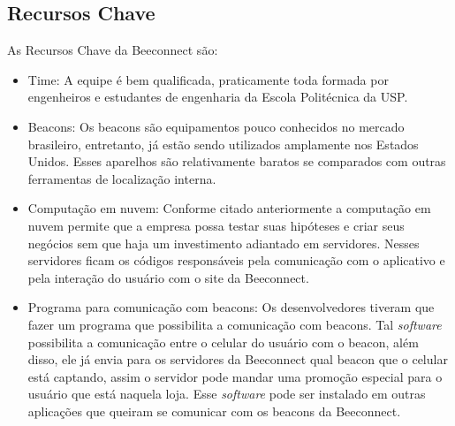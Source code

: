 \subsection{Recursos Chave}
\label{cha:recursos_chave}
As Recursos Chave da Beeconnect são:
\begin{itemize}
\item Time: A equipe é bem qualificada, praticamente toda formada por engenheiros e estudantes de engenharia da Escola Politécnica da USP.
\item Beacons: Os beacons são equipamentos pouco conhecidos no mercado brasileiro, entretanto, já estão sendo utilizados amplamente nos Estados Unidos. Esses aparelhos são relativamente baratos se comparados com outras ferramentas de localização interna. 
\item Computação em nuvem: Conforme citado anteriormente a computação em nuvem permite que a empresa possa testar suas hipóteses e criar seus negócios sem que haja um investimento adiantado em servidores. Nesses servidores ficam os códigos responsáveis pela comunicação com o aplicativo e pela interação do usuário com o site da Beeconnect.
\item Programa para comunicação com beacons: Os desenvolvedores tiveram que fazer um programa que possibilita a comunicação com beacons. Tal \textit{software} possibilita a comunicação entre o celular do usuário com o beacon, além disso, ele já envia para os servidores da Beeconnect qual beacon que o celular está captando, assim o servidor pode mandar uma promoção especial para o usuário que está naquela loja. Esse \textit{software} pode ser instalado em outras aplicações que queiram se comunicar com os beacons da Beeconnect.
\end{itemize}

